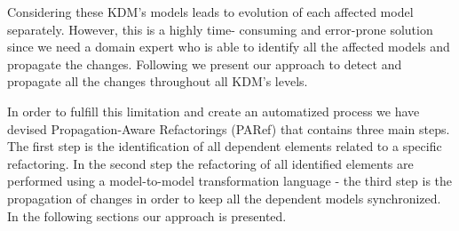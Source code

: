 Considering these KDM's models leads to evolution of each affected model separately. However, this is a highly time- consuming and error-prone solution since we need a domain expert who is able to identify all the affected models and propagate the changes. Following we present our approach to detect and propagate all the changes throughout all KDM's levels.




In order to fulfill this limitation and create an automatized process we have devised Propagation-Aware Refactorings (PARef) that contains three main steps. The first step is the identification of all dependent elements related to a specific refactoring. In the second step the refactoring of all identified elements are performed using a model-to-model transformation language - the third step is the propagation of changes in order to keep all the dependent models synchronized. %
In the following sections our approach is presented.
 
